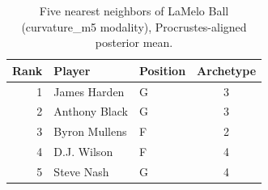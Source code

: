 \begin{table}[htbp]
  \centering\small
  \begin{tabular}{rllc}
    \toprule
    Rank & Player & Position & Archetype \\
    \midrule
    1 & James Harden & G & 3 \\
    2 & Anthony Black & G & 3 \\
    3 & Byron Mullens & F & 2 \\
    4 & D.J. Wilson & F & 4 \\
    5 & Steve Nash & G & 4 \\
    \bottomrule
  \end{tabular}
  \caption{Five nearest neighbors of LaMelo Ball (curvature_m5 modality), Procrustes-aligned posterior mean.}
  \label{tab:LaMelo_Ball_neighbors_curvature_m5}
\end{table}

